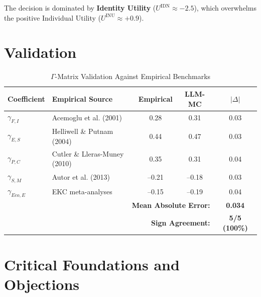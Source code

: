 The decision is dominated by \textbf{Identity Utility} ($U^{\text{IDN}} \approx -2.5$), 
which overwhelms the positive Individual Utility ($U^{\text{INU}} \approx +0.9$).

\section{Validation}
\label{sec:app-c-validation}

\begin{table}[htbp]
\centering
\caption{$\Gamma$-Matrix Validation Against Empirical Benchmarks}
\label{tab:app-c-validation}
\renewcommand{\arraystretch}{1.3}
\begin{tabular}{@{}llccc@{}}
\toprule
\textbf{Coefficient} & \textbf{Empirical Source} & \textbf{Empirical} & \textbf{LLM-MC} & \textbf{$|\Delta|$} \\
\midrule
$\gamma_{F,I}$ & Acemoglu et al. (2001) & 0.28 & 0.31 & 0.03 \\
$\gamma_{E,S}$ & Helliwell \& Putnam (2004) & 0.44 & 0.47 & 0.03 \\
$\gamma_{P,C}$ & Cutler \& Lleras-Muney (2010) & 0.35 & 0.31 & 0.04 \\
$\gamma_{S,M}$ & Autor et al. (2013) & --0.21 & --0.18 & 0.03 \\
$\gamma_{Eco,E}$ & EKC meta-analyses & --0.15 & --0.19 & 0.04 \\
\midrule
\multicolumn{4}{r}{\textbf{Mean Absolute Error:}} & \textbf{0.034} \\
\multicolumn{4}{r}{\textbf{Sign Agreement:}} & \textbf{5/5 (100\%)} \\
\bottomrule
\end{tabular}
\end{table}


\section{Critical Foundations and Objections}
\label{sec:C-foundations}

